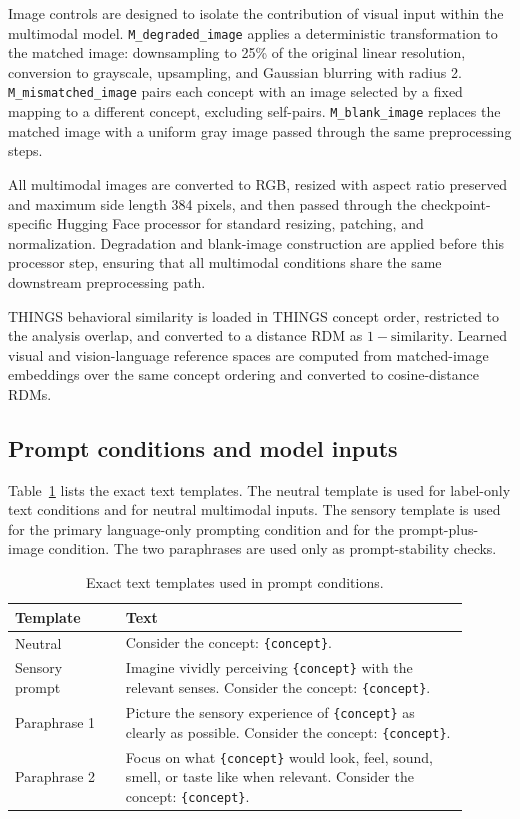 \documentclass{article}
\begin{document}
Image controls are designed to isolate the contribution of visual input within the multimodal model. \texttt{M\_degraded\_image} applies a deterministic transformation to the matched image: downsampling to 25\% of the original linear resolution, conversion to grayscale, upsampling, and Gaussian blurring with radius 2. \texttt{M\_mismatched\_image} pairs each concept with an image selected by a fixed mapping to a different concept, excluding self-pairs. \texttt{M\_blank\_image} replaces the matched image with a uniform gray image passed through the same preprocessing steps.

All multimodal images are converted to RGB, resized with aspect ratio preserved and maximum side length 384 pixels, and then passed through the checkpoint-specific Hugging Face processor for standard resizing, patching, and normalization. Degradation and blank-image construction are applied before this processor step, ensuring that all multimodal conditions share the same downstream preprocessing path.

THINGS behavioral similarity is loaded in THINGS concept order, restricted to the analysis overlap, and converted to a distance RDM as \(1-\mathrm{similarity}\). Learned visual and vision-language reference spaces are computed from matched-image embeddings over the same concept ordering and converted to cosine-distance RDMs.

\subsection{Prompt conditions and model inputs}

Table~\ref{tab:appendix_prompts} lists the exact text templates. The neutral template is used for label-only text conditions and for neutral multimodal inputs. The sensory template is used for the primary language-only prompting condition and for the prompt-plus-image condition. The two paraphrases are used only as prompt-stability checks.

\begin{table}[!htbp]
\centering
\caption{Exact text templates used in prompt conditions.}
\label{tab:appendix_prompts}
\begin{tabular}{p{0.22\linewidth}p{0.68\linewidth}}
\toprule
Template & Text \\
\midrule
Neutral & Consider the concept: \texttt{\{concept\}}. \\
Sensory prompt & Imagine vividly perceiving \texttt{\{concept\}} with the relevant senses. Consider the concept: \texttt{\{concept\}}. \\
Paraphrase 1 & Picture the sensory experience of \texttt{\{concept\}} as clearly as possible. Consider the concept: \texttt{\{concept\}}. \\
Paraphrase 2 & Focus on what \texttt{\{concept\}} would look, feel, sound, smell, or taste like when relevant. Consider the concept: \texttt{\{concept\}}. \\
\bottomrule
\end{tabular}
\end{table}
\end{document}
